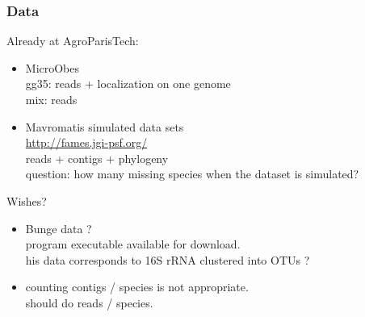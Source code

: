 \documentclass{beamer}
\begin{document}
\begin{frame}\frametitle{Data}

Already at AgroParisTech:
\begin{itemize}
 \item MicroObes \\
    gg35: reads + localization on one genome \\
    mix: reads
 \item Mavromatis simulated data sets \\
    \url{http://fames.jgi-psf.org/} \\
    reads + contigs + phylogeny \\
    question: how many missing species when the dataset is simulated?
\end{itemize}

Wishes?
\begin{itemize}
 \item Bunge data ? \\
    program executable available for download. \\
    his data corresponds to 16S rRNA clustered into OTUs ?
 \item counting contigs / species is not appropriate. \\
    should do reads / species.
\end{itemize}
\end{frame}

%  
\end{document}
